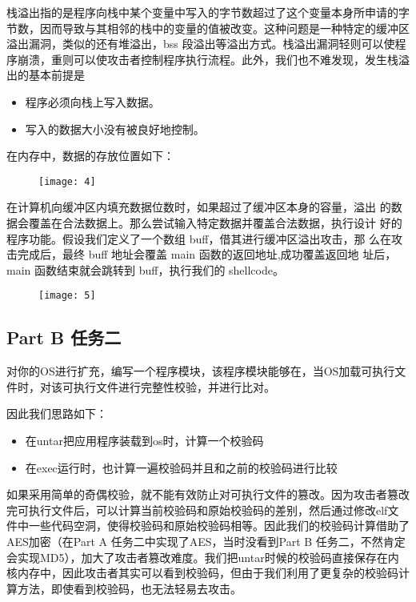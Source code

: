 \documentclass{whureport}
\begin{document}
栈溢出指的是程序向栈中某个变量中写入的字节数超过了这个变量本身所申请的字节数，因而导致与其相邻的栈中的变量的值被改变。这种问题是一种特定的缓冲区溢出漏洞，类似的还有堆溢出，bss 段溢出等溢出方式。栈溢出漏洞轻则可以使程序崩溃，重则可以使攻击者控制程序执行流程。此外，我们也不难发现，发生栈溢出的基本前提是

\begin{itemize}
  \item 程序必须向栈上写入数据。
  \item 写入的数据大小没有被良好地控制。
\end{itemize}


在内存中，数据的存放位置如下：

\begin{figure}[H]
\centering
\texttt{[image: 4]}
\end{figure}

在计算机向缓冲区内填充数据位数时，如果超过了缓冲区本身的容量，溢出 的数据会覆盖在合法数据上。那么尝试输入特定数据并覆盖合法数据，执行设计 好的程序功能。假设我们定义了一个数组 buff，借其进行缓冲区溢出攻击，那 么在攻击完成后，最终 buff 地址会覆盖 main 函数的返回地址,成功覆盖返回地 址后，main 函数结束就会跳转到 buff，执行我们的 shellcode。

\begin{figure}[H]
\centering
\texttt{[image: 5]}
\end{figure}


\subsection{Part B 任务二}
对你的OS进行扩充，编写一个程序模块，该程序模块能够在，当OS加载可执行文件时，对该可执行文件进行完整性校验，并进行比对。

因此我们思路如下：
\begin{itemize}
  \item 在untar把应用程序装载到os时，计算一个校验码
  \item 在exec运行时，也计算一遍校验码并且和之前的校验码进行比较
\end{itemize}

如果采用简单的奇偶校验，就不能有效防止对可执行文件的篡改。因为攻击者篡改完可执行文件后，可以计算当前校验码和原始校验码的差别，然后通过修改elf文件中一些代码空洞，使得校验码和原始校验码相等。因此我们的校验码计算借助了AES加密（在Part A 任务二中实现了AES，当时没看到Part B 任务二，不然肯定会实现MD5），加大了攻击者篡改难度。我们把untar时候的校验码直接保存在内核内存中，因此攻击者其实可以看到校验码，但由于我们利用了更复杂的校验码计算方法，即使看到校验码，也无法轻易去攻击。
\end{document}
